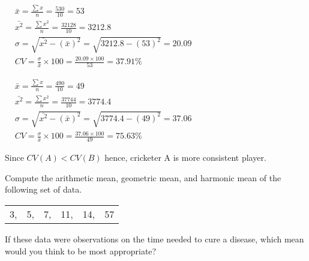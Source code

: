 \documentclass[12pt]{article}
\begin{document}
\vspace{1ex}
\begin{minipage}[t]{0.463\linewidth}
   \noindent
   \vspace{1ex}
   $\begin{aligned}
      &\bar{x} = \frac{\sum{x}}{n} = \frac{530}{10} = 53\\[1ex]
      &\bar{x^2} = \frac{\sum{x^2}}{n} = \frac{32128}{10} = 3212.8\\[1ex]
      &\sigma = \sqrt{\bar{x^2} - (\bar{x})^2} = \sqrt{3212.8 - (53)^2} = 20.09\\[1ex]
      &CV = \frac{\sigma}{\bar{x}}\times 100 = \frac{20.09 \times 100}{53} = 37.91\%
   \end{aligned}$

\end{minipage}\vrule\hspace{0.8ex}
\begin{minipage}[t]{0.52\linewidth}
   \noindent
   \vspace{1ex}
   $\begin{aligned}
      &\bar{x} = \frac{\sum{x}}{n} = \frac{490}{10} = 49\\[1ex]
      &\bar{x^2} = \frac{\sum{x^2}}{n} = \frac{37744}{10} = 3774.4\\[1ex]
      &\sigma = \sqrt{\bar{x^2} - (\bar{x})^2} = \sqrt{3774.4 - (49)^2} = 37.06\\[1ex]
      &CV = \frac{\sigma}{\bar{x}}\times 100 = \frac{37.06 \times 100}{49} = 75.63\%
   \end{aligned}$
\end{minipage}

\vspace{2ex}
Since $CV(A) < CV(B)$ hence, cricketer A is more consistent player.

\vspace{5ex}
\textbf{} Compute the arithmetic mean, geometric mean, and harmonic mean of the following set of data.
\vspace{-1.5\baselineskip}
\begin{center}
   \begin{tabular}{cccccc}
      3, & 5, & 7, & 11, & 14, & 57\\
   \end{tabular}
\end{center}

\vspace{-0.5\baselineskip}
If these data were observations on the time needed to cure a disease, which mean would you think to be most appropriate?
\end{document}

